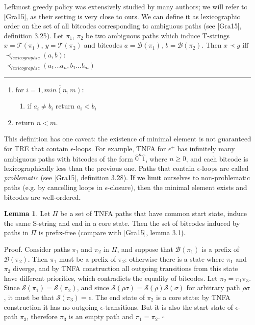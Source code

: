 \documentclass{article}
\newcommand{\Xeq}{\!=\!}
\newcommand{\XB}{\mathcal{B}}
\newcommand{\XS}{\mathcal{S}}
\newcommand{\XT}{\mathcal{T}}
\theoremstyle{definition}
\newtheorem{XLem}{Lemma}
\begin{document}
\begin{multicols}{2}
Leftmost greedy policy was extensively studied by many authors; we will refer to [Gra15], as their setting is very close to ours.
We can define it as lexicographic order on the set of all bitcodes corresponding to ambiguous paths
(see [Gra15], definition 3.25).
Let $\pi_1$, $\pi_2$ be two ambiguous paths which induce T-strings $x \Xeq \XT(\pi_1)$, $y \Xeq \XT(\pi_2)$
and bitcodes $a \Xeq \XB(\pi_1)$, $b \Xeq \XB(\pi_2)$.
Then $x \prec y$ iff $\prec_{lexicographic} (a, b)$:
\\

    $\prec_{lexicographic} (a_1 \dots a_n, b_1 \dots b_m)$
    \hrule
    \begin{enumerate}[leftmargin=0in]
        \smallskip
        \item[] for $i \Xeq \overline{1, min(n, m)}$:
        \begin{enumerate}
            \item[] if $a_i \!\neq\! b_i$ return $a_i \!<\! b_i$
        \end{enumerate}
        \item[] return $n \!<\! m$.
        \\
    \end{enumerate}
    \bigskip

This definition has one caveat: the existence of minimal element is not guaranteed for TRE that contain $\epsilon$-loops.
For example, TNFA for $\epsilon^+$ has infinitely many ambiguous paths with bitcodes
of the form $\widehat{0}^n \widehat{1}$, where $n \!\geq\! 0$,
and each bitcode is lexicographically less than the previous one.
Paths that contain $\epsilon$-loops are called \emph{problematic} (see [Gra15], definition 3.28).
If we limit ourselves to non-problematic paths (e.g. by cancelling loops in $\epsilon$-closure),
then the minimal element exists and bitcodes are well-ordered.

\begin{XLem}\label{lemma_bitcodes}
Let $\Pi$ be a set of TNFA paths that have common start state, induce the same S-string and end in a core state.
Then the set of bitcodes induced by paths in $\Pi$ is prefix-free
(compare with [Gra15], lemma 3.1).

\medskip

Proof.
Consider paths $\pi_1$ and $\pi_2$ in $\Pi$,
and suppose that $\XB(\pi_1)$ is a prefix of $\XB(\pi_2)$.
Then $\pi_1$ must be a prefix of $\pi_2$: otherwise there is a state where $\pi_1$ and $\pi_2$ diverge,
and by TNFA construction all outgoing transitions from this state have different priorities,
which contradicts the equality of bitcodes.
Let $\pi_2 \Xeq \pi_1 \pi_3$.
Since $\XS(\pi_1) \Xeq \XS(\pi_2)$, and since $\XS(\rho\sigma) \Xeq \XS(\rho)\XS(\sigma)$ for arbitrary path $\rho\sigma$,
it must be that $\XS(\pi_3) \Xeq \epsilon$.
The end state of $\pi_2$ is a core state: by TNFA construction it has no outgoing $\epsilon$-transitions.
But it is also the start state of $\epsilon$-path $\pi_3$, therefore $\pi_3$ is an empty path and $\pi_1 \Xeq \pi_2$.
$\square$
\end{XLem}


\end{multicols}
\end{document}
